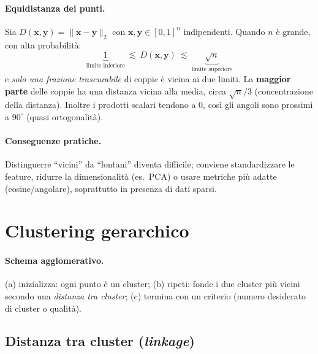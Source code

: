 \paragraph{Equidistanza dei punti.}
Sia $D(\mathbf{x},\mathbf{y})=\|\mathbf{x}-\mathbf{y}\|_2$ con $\mathbf{x},\mathbf{y}\in[0,1]^n$ indipendenti.
Quando $n$ è grande, con alta probabilità:
\[
\underbrace{1}_{\text{limite inferiore}} \ \lesssim\ D(\mathbf{x},\mathbf{y})\ \lesssim\ \underbrace{\sqrt{n}}_{\text{limite superiore}}
\]
e \emph{solo una frazione trascurabile} di coppie è vicina ai due limiti. La \textbf{maggior parte} delle coppie ha una distanza
vicina alla media, circa $\sqrt{n}/3$ (concentrazione della distanza). Inoltre i prodotti scalari tendono a $0$,
così gli angoli sono prossimi a $90^\circ$ (quasi ortogonalità).

\paragraph{Conseguenze pratiche.}
Distinguerre “vicini” da “lontani” diventa difficile; conviene standardizzare le feature, ridurre la dimensionalità (es.\ PCA)
o usare metriche più adatte (cosine/angolare), soprattutto in presenza di dati sparsi.


\section{Clustering gerarchico}\label{sec:hierarchical}
\paragraph{Schema agglomerativo.}
(a) inizializza: ogni punto è un cluster; (b) ripeti: fonde i due cluster più vicini secondo una \emph{distanza tra cluster}; (c) termina con un criterio (numero desiderato di cluster o qualità).

\subsection{Distanza tra cluster (\emph{linkage})}\label{subsec:linkages}

